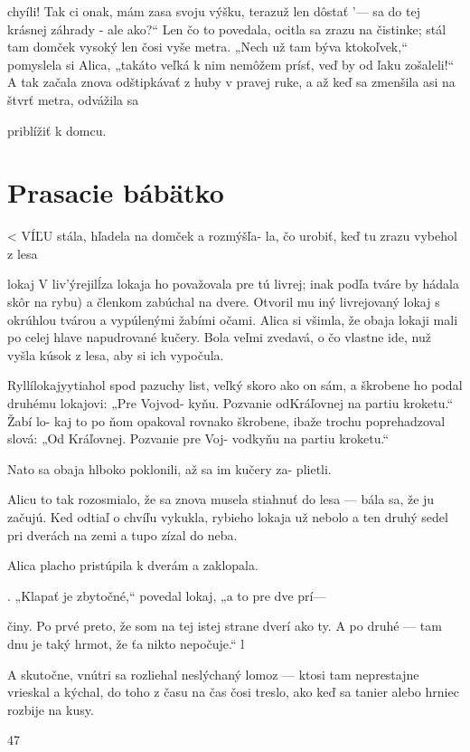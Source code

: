 \documentclass[12pt]{book}
\begin{document}
\begin{Parallel}[p]{}{}
{chyíli! Tak ci onak, mám zasa svoju výšku, terazuž len dôstať '—
sa do tej krásnej záhrady - ale ako?“ Len čo to povedala,
ocitla sa zrazu na čistinke; stál tam domček vysoký len čosi
vyše metra. „Nech už tam býva ktokoľvek,“ pomyslela si
Alica, „takáto veľká k nim nemôžem prísť, veď by od ľaku
zošaleli!“ A tak začala znova odštipkávať z huby v pravej
ruke, a až keď sa zmenšila asi na štvrť metra, odvážila sa

priblížiť k domcu.

\section{Prasacie bábätko}

< VÍĽU stála, hľadela na domček a rozmýšľa-
la, čo urobiť, keď tu zrazu vybehol z lesa

lokaj  V liv'ýrejilĺza lokaja ho považovala pre tú livrej; inak
podľa tváre by hádala skôr na rybu) a členkom zabúchal na
dvere. Otvoril mu iný livrejovaný lokaj s okrúhlou tvárou
a vypúlenými žabími očami. Alica si všimla, že obaja lokaji
mali po celej hlave napudrované kučery. Bola veľmi
zvedavá, o čo vlastne ide, nuž vyšla kúsok z lesa, aby si ich
vypočula.

Ryllílokajyytiahol spod pazuchy list, veľký skoro ako on
sám, a škrobene ho podal druhému lokajovi: „Pre Vojvod-
 kyňu. Pozvanie odKráľovnej na partiu kroketu.“ Žabí lo-
kaj to po ňom opakoval rovnako škrobene, ibaže trochu
poprehadzoval slová: „Od Kráľovnej. Pozvanie pre Voj-
vodkyňu na partiu kroketu.“

Nato sa obaja hlboko poklonili, až sa im kučery za-
plietli.

Alicu to tak rozosmialo, že sa znova musela stiahnuť do
lesa — bála sa, že ju začujú. Ked odtiaľ o chvíľu vykukla,
rybieho lokaja už nebolo a ten druhý sedel pri dverách na
zemi a tupo zízal do neba.

Alica placho pristúpila k dverám a zaklopala.

. „Klapať je zbytočné,“ povedal lokaj, „a to pre dve prí—

činy. Po prvé preto, že som na tej istej strane dverí ako ty.  
A po druhé — tam dnu je taký hrmot, že ťa nikto nepočuje.“ l

A skutočne, vnútri sa rozliehal neslýchaný lomoz — ktosi
tam neprestajne vrieskal a kýchal, do toho z času na čas čosi
treslo, ako keď sa tanier alebo hrniec rozbije na kusy.

47

  

}
\end{Parallel}
\end{document}
